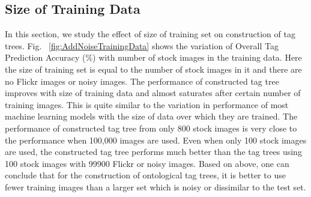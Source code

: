 \subsection{Size of Training Data}
\label{sec:RobustSize}
In this section, we study the effect of size of training set on construction of tag trees. Fig. ~\ref{fig:AddNoiseTrainingData} shows the variation of Overall Tag Prediction Accuracy (\%) with number of stock images in the training data. Here the size of training set is equal to the number of stock images in it and there are no Flickr images or noisy images. The performance of constructed tag tree improves with size of training data and almost saturates after certain number of training images. This is quite similar to the variation in performance of most machine learning models with the size of data over which they are trained. The performance of constructed tag tree from only 800 stock images is very close to the performance when 100,000 images are used. Even when only 100 stock images are used, the constructed tag tree performs much better than the tag trees using 100 stock images with 99900 Flickr or noisy images. Based on above, one can conclude that for the construction of ontological tag trees, it is better to use fewer training images than a larger set which is noisy or dissimilar to the test set.  
